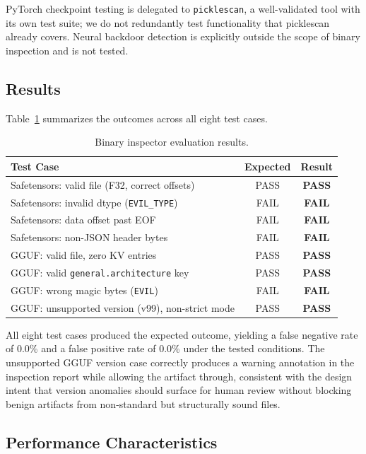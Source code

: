 \documentclass[sigconf,review]{acmart}
\begin{document}
PyTorch checkpoint testing is delegated to \texttt{picklescan}, a
well-validated tool with its own test suite; we do not redundantly test
functionality that picklescan already covers. Neural backdoor detection is
explicitly outside the scope of binary inspection and is not tested.

\subsection{Results}

Table~\ref{tab:results} summarizes the outcomes across all eight test cases.

\begin{table}[h]
\caption{Binary inspector evaluation results.}
\label{tab:results}
\begin{tabular}{p{}cc}
\toprule
\textbf{Test Case} & \textbf{Expected} & \textbf{Result} \\
\midrule
Safetensors: valid file (F32, correct offsets)  & PASS & \textbf{PASS} \\
Safetensors: invalid dtype (\texttt{EVIL\_TYPE}) & FAIL & \textbf{FAIL} \\
Safetensors: data offset past EOF               & FAIL & \textbf{FAIL} \\
Safetensors: non-JSON header bytes              & FAIL & \textbf{FAIL} \\
GGUF: valid file, zero KV entries               & PASS & \textbf{PASS} \\
GGUF: valid \texttt{general.architecture} key   & PASS & \textbf{PASS} \\
GGUF: wrong magic bytes (\texttt{EVIL})         & FAIL & \textbf{FAIL} \\
GGUF: unsupported version (v99), non-strict mode & PASS & \textbf{PASS} \\
\bottomrule
\end{tabular}
\end{table}

All eight test cases produced the expected outcome, yielding a false
negative rate of 0.0\% and a false positive rate of 0.0\% under the tested
conditions. The unsupported GGUF version case correctly produces a warning
annotation in the inspection report while allowing the artifact through,
consistent with the design intent that version anomalies should surface for
human review without blocking benign artifacts from non-standard but
structurally sound files.

\subsection{Performance Characteristics}
\end{document}
